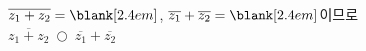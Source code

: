 $\overline{z_1+z_2}=\blank[2.4em]$, $\overline{z_1}+\overline{z_2}=\blank[2.4em]$이므로\\ $\overline{z_1+z_2}\ \bigcirc\ \overline{z_1}+\overline{z_2}$
